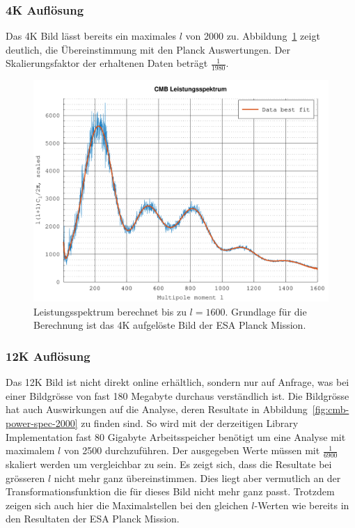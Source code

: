 \subsubsection{4K Auflösung}

Das 4K Bild lässt bereits ein maximales $l$ von 2000 zu. 
Abbildung~\ref{fig:cmb-power-spec-1600} zeigt deutlich, die Übereinstimmung mit 
den Planck Auswertungen. Der Skalierungsfaktor der erhaltenen Daten beträgt 
$\frac{1}{1980}$.

\begin{figure}
	\centering
	\includegraphics[width=\linewidth]{cmb/data/4k1800-500.pdf}
	\caption{Leistungsspektrum berechnet bis zu $l = 1600$. Grundlage für die 
		Berechnung ist das 4K aufgelöste Bild der ESA Planck Mission.}
	\label{fig:cmb-power-spec-1600}
\end{figure}

\subsubsection{12K Auflösung}

Das 12K Bild ist nicht direkt online erhältlich, sondern nur auf Anfrage, was 
bei einer Bildgrösse von fast 180 Megabyte durchaus verständlich ist. Die 
Bildgrösse hat auch Auswirkungen auf die Analyse, deren Resultate in 
Abbildung~\ref{fig:cmb-power-spec-2000} zu finden sind. So wird mit der 
derzeitigen Library Implementation fast 80 Gigabyte Arbeitsspeicher benötigt um 
eine Analyse mit maximalem $l$ von 2500 durchzuführen. Der ausgegeben Werte 
müssen mit $\frac{1}{6900}$ skaliert werden um vergleichbar zu sein. Es zeigt 
sich, dass die Resultate bei grösseren $l$ nicht mehr ganz übereinstimmen. Dies 
liegt aber vermutlich an der Transformationsfunktion die für dieses Bild nicht 
mehr ganz passt. Trotzdem zeigen sich auch hier die Maximalstellen bei den 
gleichen 
$l$-Werten wie bereits in den Resultaten der ESA Planck Mission.

